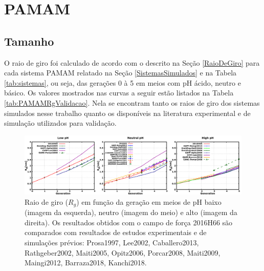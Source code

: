 \section{PAMAM}

\subsection{Tamanho}\label{PAMAMTamanho}
O raio de giro foi calculado de acordo com o descrito na Seção \ref{RaioDeGiro} para cada sistema PAMAM relatado na Seção \ref{SistemasSimulados} e na Tabela \ref{tab:sistemas}, ou seja, das gerações 0 à 5 em meios com pH ácido, neutro e básico.
Os valores mostrados nas curvas a seguir estão listados na Tabela \ref{tab:PAMAMRgValidacao}.
Nela se encontram tanto os raios de giro dos sistemas simulados nesse trabalho quanto os disponíveis na literatura experimental e de simulação utilizados para validação.

\begin{figure}[ht!]
\centering
\includegraphics[width=\textwidth]{images/PAMAMRg.png}
\caption{Raio de giro ($R_g$) em função da geração em meios de pH baixo (imagem da esquerda), neutro (imagem do meio) e alto (imagem da direita).
Os resultados obtidos com o campo de força 2016H66\cite{Horta2016} são comparados com resultados de estudos experimentais e de simulações prévios:
Prosa1997\cite{Prosa1997}, %
Lee2002\cite{Lee2002}, %
Caballero2013\cite{Caballero2013}, %
Rathgeber2002\cite{Rathgeber2002}, %
Maiti2005\cite{Maiti2005}, %
Opitz2006\cite{Opitz2006}, %
Porcar2008\cite{Porcar2008}, %
Maiti2009\cite{Maiti2009}, %
Maingi2012\cite{Maingi2012}, %
Barraza2018\cite{Barraza2018}, %
Kanchi2018\cite{Kanchi2018}.} %
\label{fig:PAMAMRg}
\end{figure}


